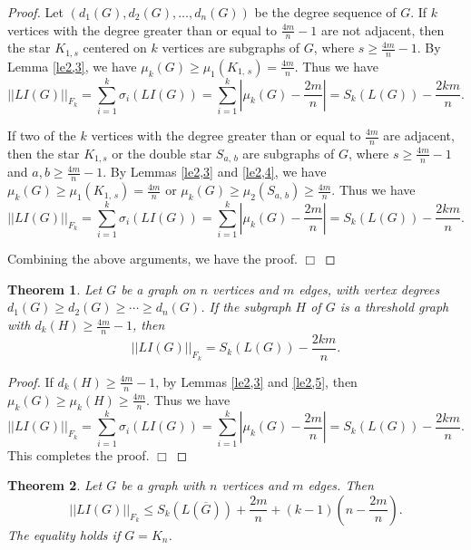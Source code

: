 \documentclass[12pt, a4paper]{article}
\newtheorem{theorem}{Theorem}[section]
\begin{document}
\begin{proof} Let $(d_1(G), d_2(G), \ldots, d_n(G))$ be the degree sequence of $G$. If $k$ vertices with the degree greater than or equal to $\frac{4m}{n}-1$ are not adjacent, then the star $K_{1, s}$ centered on $k$ vertices are subgraphs of $G$, where $s\geq \frac{4m}{n}-1$. By Lemma \ref{le2,3}, we have $\mu_k(G)\geq \mu_1(K_{1,\, s})= \frac{4m}{n}$. Thus we have
$$||LI(G)||_{F_k} = \sum\limits_{i=1}^{k}\sigma_i(LI(G))=\sum\limits_{i=1}^{k}\left\lvert \mu_k(G)-\frac{2m}{n}\right\lvert=S_k(L(G))-\frac{2km}{n}.$$

If two of the $k$ vertices with the degree greater than or equal to $\frac{4m}{n}$ are adjacent, then the star $K_{1, s}$ or the double star $S_{a,\,b}$ are subgraphs of $G$, where $s\geq \frac{4m}{n}-1$ and $a, b \geq \frac{4m}{n}-1$. By Lemmas \ref{le2,3} and \ref{le2,4}, we have $\mu_k(G)\geq \mu_1(K_{1,\, s})= \frac{4m}{n}$ or $\mu_k(G)\geq \mu_2(S_{a,\,b})\geq \frac{4m}{n}$. Thus we have
$$||LI(G)||_{F_k} = \sum\limits_{i=1}^{k}\sigma_i(LI(G))=\sum\limits_{i=1}^{k}\left\lvert \mu_k(G)-\frac{2m}{n}\right\lvert=S_k(L(G))-\frac{2km}{n}.$$

Combining the above arguments, we have the proof. $\Box$
\end{proof}



\begin{theorem}\label{th4,2} %
Let $G$ be a graph on $n$ vertices and $m$ edges, with vertex degrees $d_1(G)\geq d_2(G)\geq \cdots \geq d_n(G)$. If the subgraph $H$ of $G$ is a threshold graph with $d_k(H)\geq \frac{4m}{n}-1$, then
$$||LI(G)||_{F_k}=S_k(L(G))-\frac{2km}{n}.$$
\end{theorem}


\begin{proof} If $d_k(H)\geq \frac{4m}{n}-1$, by Lemmas \ref{le2,3} and \ref{le2,5}, then $\mu_k(G)\geq \mu_k(H)\geq \frac{4m}{n}$. Thus we have
$$||LI(G)||_{F_k} = \sum\limits_{i=1}^{k}\sigma_i(LI(G))=\sum\limits_{i=1}^{k}\left\lvert \mu_k(G)-\frac{2m}{n}\right\lvert=S_k(L(G))-\frac{2km}{n}.$$
This completes the proof. $\Box$
\end{proof}


\begin{theorem}\label{th4,3} %
Let $G$ be a graph with $n$ vertices and $m$ edges. Then
$$||LI(G)||_{F_k}\leq S_{k}(L(\overline{G}))+\frac{2m}{n}+(k-1)(n-\frac{2m}{n}).$$
The equality holds if $G=K_n$.
\end{theorem}
\end{document}
